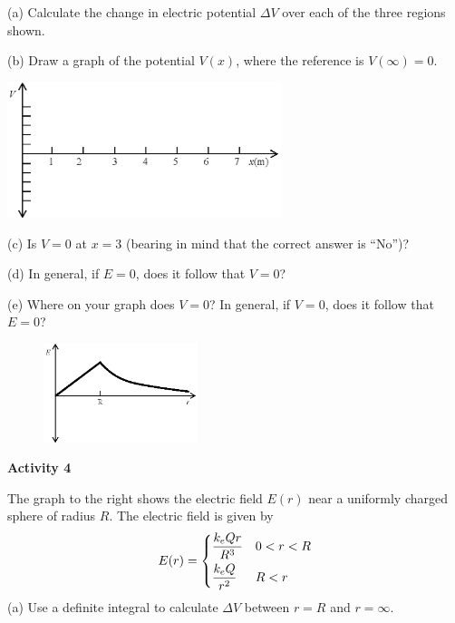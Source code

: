 (a) Calculate the change in electric potential $\Delta V$ over each of the three regions shown.
\vspace{1.2in}

(b) Draw a graph of the potential $V(x)$, where the reference is $V(\infty)=0$.
\begin{center}
\includegraphics[width=0.6\textwidth]{finding_v_from_e/fig6.eps}
\end{center}

(c) Is $V=0$ at $x=3$ (bearing in mind that the correct answer is ``No'')?
\vspace{0.6in}

(d) In general, if $E=0$, does it follow that $V=0$?
\vspace{0.6in}

(e) Where on your graph does $V=0$?  In general, if $V=0$, does it follow that $E=0$?
\vspace{0.6in}

\pagebreak
\begin{figure}
    \includegraphics[width=0.4\textwidth]{finding_v_from_e/fig7.eps}
\end{figure}

\textbf{Activity 4} 

The graph to the right shows the electric field $E(r)$ near a uniformly charged sphere of radius $R$.  The electric field is given by
\begin{displaymath}
E(r) = \begin{dcases}
        \frac{k_eQr}{R^3}  &  0<r<R\\
        \frac{k_eQ}{r^2}  &  R<r
        \end{dcases}
\end{displaymath}
(a) Use a definite integral to calculate $\Delta V$  between $r=R$ and $r=\infty$.
\vspace{1.1in}

